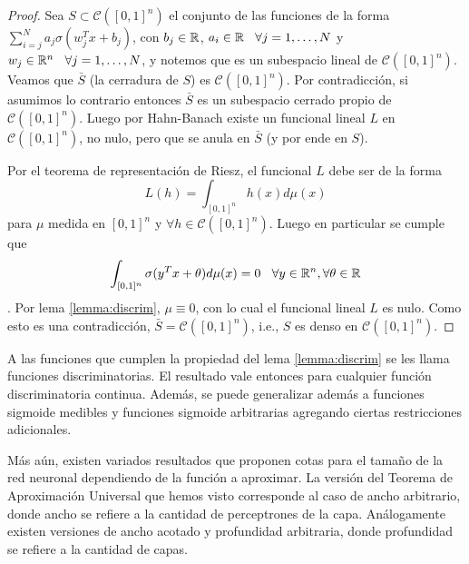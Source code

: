 \begin{proof}
\gris
Sea $S\subset\mathcal{C}([0,1]^n)$ el conjunto de las funciones de la forma $\displaystyle \sum^N_{i=j}a_j\sigma(w^T_jx+b_j)$, con  $b_j\in\mathbb{R}$, $a_i\in\mathbb{R}\hspace{.25cm}\, \forall j=1,\dots,N$ y $w_j\in\mathbb{R}^n\hspace{.25cm}\,\forall j=1,\dots,N$, y notemos que es un subespacio lineal de $\mathcal{C}([0,1]^n)$. Veamos que $\bar S$ (la cerradura de $S$) es $\mathcal{C}([0,1]^n)$. Por contradicción, si asumimos lo contrario entonces $\bar S$ es un subespacio cerrado propio de $\mathcal{C}([0,1]^n)$. Luego por Hahn-Banach existe un funcional lineal $L$ en $\mathcal{C}([0,1]^n)$, no nulo, pero que se anula en $\bar S$ (y por ende en $S$).

\newp Por el teorema de representación de Riesz, el funcional $L$ debe ser de la forma
$$ L(h) = \displaystyle\int_{[0,1]^n}h(x)d\mu(x)$$
para $\mu$ medida en $[0,1]^n$ y $\forall h\in \mathcal{C}([0,1]^n)$. Luego en particular se cumple que
$$\int_{[0,1]^n}\sigma(y^Tx+\theta)d\mu(x)=0 \hspace{.25cm}\, \forall y\in\mathbb{R}^n,\forall\theta \in\mathbb{R}$$. Por lema \ref{lemma:discrim}, $\mu\equiv 0$, con lo cual el funcional lineal $L$ es nulo. Como esto es una contradicción, $\bar S = \mathcal{C}([0,1]^n)$, i.e., $S$ es denso en $\mathcal{C}([0,1]^n)$.\findem
\negro
\end{proof}
\begin{remark}
A las funciones que cumplen la propiedad del lema \ref{lemma:discrim} se les llama funciones discriminatorias. El resultado vale entonces para cualquier función discriminatoria continua. Además, se puede generalizar además a funciones sigmoide medibles y funciones sigmoide arbitrarias agregando ciertas restricciones adicionales.

Más aún, existen variados resultados que proponen cotas para el tamaño de la red neuronal dependiendo de la función a aproximar. La versión del Teorema de Aproximación Universal que hemos visto corresponde al caso de ancho arbitrario, donde ancho se refiere a la cantidad de perceptrones de la capa. Análogamente existen versiones de ancho acotado y profundidad arbitraria, donde profundidad se refiere a la cantidad de capas.
\end{remark}

